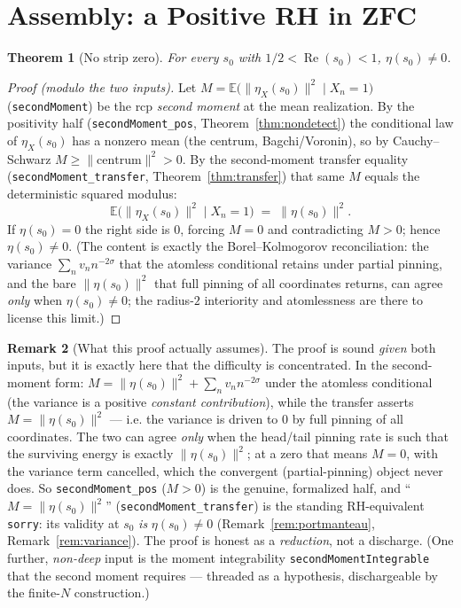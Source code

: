 \documentclass[11pt,a4paper]{article}
\newtheorem{theorem}{Theorem}[section]
\theoremstyle{definition}
\newtheorem{remark}[theorem]{Remark}
\newcommand{\Rea}{\operatorname{Re}}
\newcommand{\etaX}{\eta_X}
\begin{document}
\section{Assembly: a Positive RH in ZFC}\label{sec:assembly}

\begin{theorem}[No strip zero]\label{thm:nozero}
For every \(s_0\) with \(1/2<\Rea(s_0)<1\), \(\eta(s_0)\neq 0\).
\end{theorem}
\begin{proof}[Proof (modulo the two inputs)]
Let \(M=\mathbb{E}\bigl(\|\etaX(s_0)\|^2\mid X_n=1\bigr)\) (\texttt{secondMoment}) be the rcp
\emph{second moment} at the mean realization. By the positivity half
(\texttt{secondMoment\_pos}, Theorem~\ref{thm:nondetect}) the conditional law of \(\etaX(s_0)\) has a
nonzero mean (the centrum, Bagchi/Voronin), so by Cauchy--Schwarz
\(M\ge\|\text{centrum}\|^2>0\). By the second-moment transfer equality
(\texttt{secondMoment\_transfer}, Theorem~\ref{thm:transfer}) that same \(M\) equals the
deterministic squared modulus:
\[
  \mathbb{E}\bigl(\|\etaX(s_0)\|^2\mid X_n=1\bigr) \;=\; \|\eta(s_0)\|^2 .
\]
If \(\eta(s_0)=0\) the right side is \(0\), forcing \(M=0\) and contradicting \(M>0\); hence
\(\eta(s_0)\neq0\). (The content is exactly the Borel--Kolmogorov reconciliation: the variance
\(\sum_n v_n n^{-2\sigma}\) that the atomless conditional retains under partial pinning, and the bare
\(\|\eta(s_0)\|^2\) that full pinning of all coordinates returns, can agree \emph{only} when
\(\eta(s_0)\neq0\); the radius-\(2\) interiority and atomlessness are there to license this limit.)
\end{proof}

\begin{remark}[What this proof actually assumes]\label{rem:nozero-caveat}
The proof is sound \emph{given} both inputs, but it is exactly here that the difficulty is
concentrated. In the second-moment form: \(M=\|\eta(s_0)\|^2+\sum_n v_n n^{-2\sigma}\) under the
atomless conditional (the variance is a positive \emph{constant contribution}), while the transfer
asserts \(M=\|\eta(s_0)\|^2\) --- i.e. the variance is driven to \(0\) by full pinning of all
coordinates. The two can agree \emph{only} when the head/tail pinning rate is such that the surviving
energy is exactly \(\|\eta(s_0)\|^2\); at a zero that means \(M=0\), with the variance term
cancelled, which the convergent (partial-pinning) object never does. So
\texttt{secondMoment\_pos} (\(M>0\)) is the genuine, formalized half, and
``\(M=\|\eta(s_0)\|^2\)'' (\texttt{secondMoment\_transfer}) is the standing RH-equivalent
\texttt{sorry}: its validity at \(s_0\) \emph{is} \(\eta(s_0)\neq0\) (Remark~\ref{rem:portmanteau},
Remark~\ref{rem:variance}). The proof is honest as a \emph{reduction}, not a discharge. (One further,
\emph{non-deep} input is the moment integrability \texttt{secondMomentIntegrable} that the second
moment requires --- threaded as a hypothesis, dischargeable by the finite-\(N\) construction.)
\end{remark}
\end{document}
